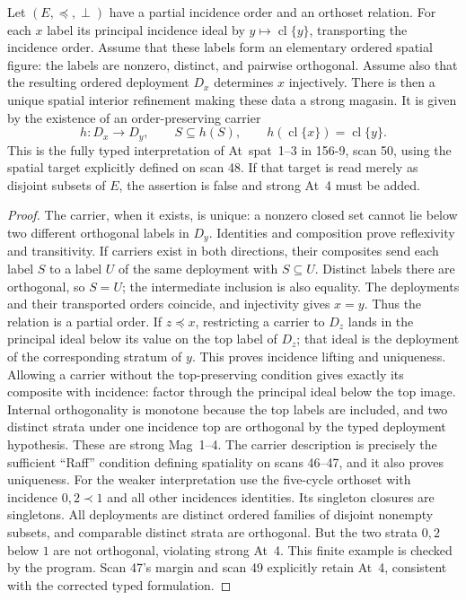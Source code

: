 \begin{theorem}
\label{SA21-A23}
Let $(E,\preceq,\perp)$ have a partial incidence order and an
orthoset relation. For each $x$ label its principal incidence ideal
by $y\mapsto\operatorname{cl}\{y\}$, transporting the incidence
order. Assume that these labels form an elementary ordered spatial
figure: the labels are nonzero, distinct, and pairwise orthogonal.
Assume also that the resulting ordered deployment $D_x$ determines
$x$ injectively. There is then a unique spatial interior refinement
making these data a strong magasin. It is given by the existence
of an order-preserving carrier
\[
 h:D_x\longrightarrow D_y,\qquad S\subseteq h(S),
 \qquad h(\operatorname{cl}\{x\})=\operatorname{cl}\{y\}.
\]
This is the fully typed interpretation of At~spat~1--3 in 156-9,
scan 50, using the spatial target explicitly defined on scan 48.
If that target is read merely as disjoint subsets of $E$, the
assertion is false and strong At~4 must be added.
\end{theorem}
\begin{proof}
The carrier, when it exists, is unique: a nonzero closed set cannot
lie below two different orthogonal labels in $D_y$. Identities and
composition prove reflexivity and transitivity. If carriers exist
in both directions, their composites send each label $S$ to a label
$U$ of the same deployment with $S\subseteq U$. Distinct labels
there are orthogonal, so $S=U$; the intermediate inclusion is also
equality. The deployments and their transported orders coincide,
and injectivity gives $x=y$. Thus the relation is a partial order.
If $z\preceq x$, restricting a carrier to $D_z$ lands in the
principal ideal below its value on the top label of $D_z$; that ideal
is the deployment of the corresponding stratum of $y$. This proves
incidence lifting and uniqueness. Allowing a carrier without the
top-preserving condition gives exactly its composite with incidence:
factor through the principal ideal below the top image. Internal
orthogonality is monotone because the top labels are included, and
two distinct strata under one incidence top are orthogonal by the
typed deployment hypothesis. These are strong Mag~1--4. The
carrier description is precisely the sufficient ``Raff'' condition
defining spatiality on scans 46--47, and it also proves uniqueness.
For the weaker interpretation use the five-cycle orthoset with
incidence $0,2\prec1$ and all other incidences identities. Its
singleton closures are singletons. All deployments are distinct
ordered families of disjoint nonempty subsets, and comparable
distinct strata are orthogonal. But the two strata $0,2$ below $1$
are not orthogonal, violating strong At~4. This finite example is
checked by the program. Scan 47's margin and scan 49 explicitly
retain At~4, consistent with the corrected typed formulation.
\end{proof}


